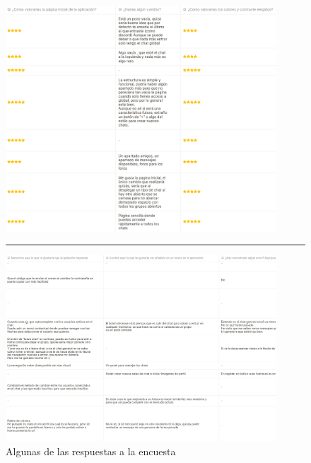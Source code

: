 \begin{itemize}
	\begin{figure}[h]
		\centering
		\includegraphics[width=0.9\textwidth]{res/images/resultados-encuesta-1}
		\vspace{1em}
		\hrule
		\vspace{1em}
		\includegraphics[width=0.9\textwidth]{res/images/resultados-encuesta-2}
		\caption{Algunas de las respuestas a la encuesta}
		\label{fig:resultados-encuesta}
	\end{figure}
\end{itemize}
